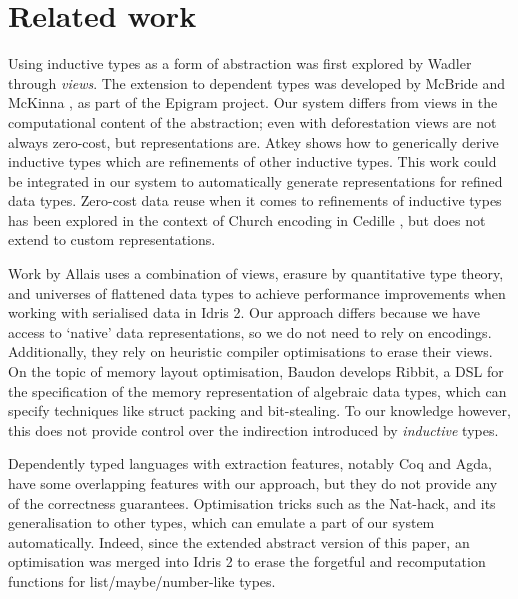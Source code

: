 \section{Related work}

Using inductive types as a form of abstraction was first explored by Wadler
\cite{Wadler1987-zp} through \emph{views}. The extension to dependent types
was developed by McBride and McKinna \cite{Mcbride2004-fd}, as part of the
Epigram project. Our system differs from views in the computational content
of the abstraction; even with deforestation \cite{Wadler1990-yo} views are not
always zero-cost, but representations are.
Atkey \cite{Atkey2011-ex} shows how to generically derive inductive types which
are refinements of other inductive types. This work could be integrated in our
system to automatically generate representations for refined data types.
Zero-cost data reuse when it comes to refinements of inductive types has been
explored in the context of Church encoding in Cedille \cite{Diehl2018-ba}, but
does not extend to custom representations.

Work by Allais \cite{Allais2023-pf,Allais2023-zq} uses a combination of views,
erasure by quantitative type theory, and universes of flattened data types to
achieve performance improvements when working with serialised data in Idris 2.
Our approach differs because we have access to `native' data representations, so
we do not need to rely on encodings. Additionally, they rely on heuristic
compiler optimisations to erase their views. On the topic of memory layout
optimisation, Baudon \cite{Baudon2023-cy} develops Ribbit, a DSL for the
specification of the memory representation of algebraic data types, which can
specify techniques like struct packing and bit-stealing. To our knowledge
however, this does not provide control over the indirection introduced by
\emph{inductive} types.

Dependently typed languages with extraction features, notably Coq and Agda, have
some overlapping features with our approach, but they do not provide any of the
correctness guarantees. Optimisation tricks such as the Nat-hack, and its
generalisation to other types, which can emulate a part of our system
automatically. Indeed, since the extended abstract version of this paper, an
optimisation was merged into Idris 2 to erase the forgetful and recomputation
functions for list/maybe/number-like types.


